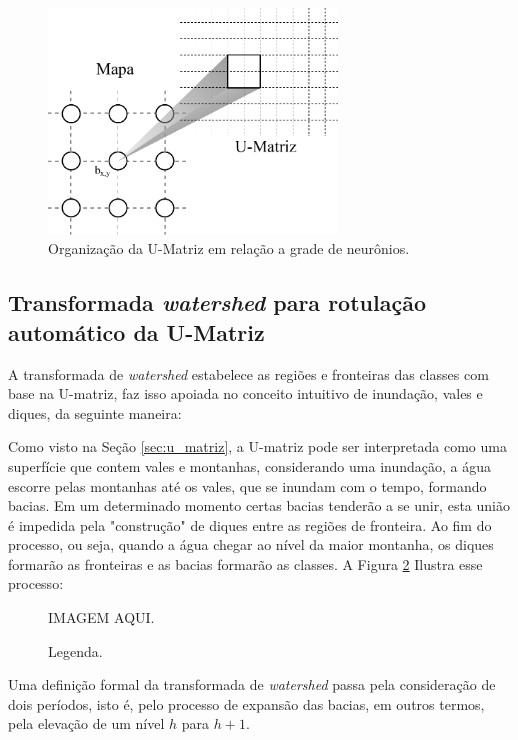 \begin{figure}[H]
  \begin{center}
    \includegraphics[height=6cm]{imagens/mapa_umatriz.pdf}
  \end{center}
  \caption{ Organização da U-Matriz em relação a grade de neurônios. }
  \label{fig:mapa_umatriz}
\end{figure}

\subsection{Transformada \textit{watershed} para rotulação automático
da U-Matriz}\label{sec:watershed}

A transformada de \textit{watershed} estabelece as regiões e fronteiras das
classes com base na U-matriz, faz isso apoiada no conceito intuitivo de
inundação, vales e diques, da seguinte maneira:

Como visto na Seção \ref{sec:u_matriz}, a U-matriz pode ser interpretada como
uma superfície que contem vales e montanhas, considerando uma inundação, a água
escorre pelas montanhas até os vales, que se inundam com o tempo, formando
bacias. Em um determinado momento certas bacias tenderão a se unir, esta união
é impedida pela "construção" de diques entre as regiões de fronteira. Ao fim do
processo, ou seja, quando a água chegar ao nível da maior montanha, os diques
formarão as fronteiras e as bacias formarão as classes. A Figura
\ref{fig:tempo_inundacao} Ilustra esse processo:

\begin{figure}[H]
  \begin{center}
    IMAGEM AQUI.
  \end{center}
  \caption{ Legenda. }
  \label{fig:tempo_inundacao}
\end{figure}

Uma definição formal da transformada de \textit{watershed} passa pela
consideração de dois períodos, isto é, pelo processo de expansão das bacias, em
outros termos, pela elevação de um nível $ h $ para $ h + 1 $.

